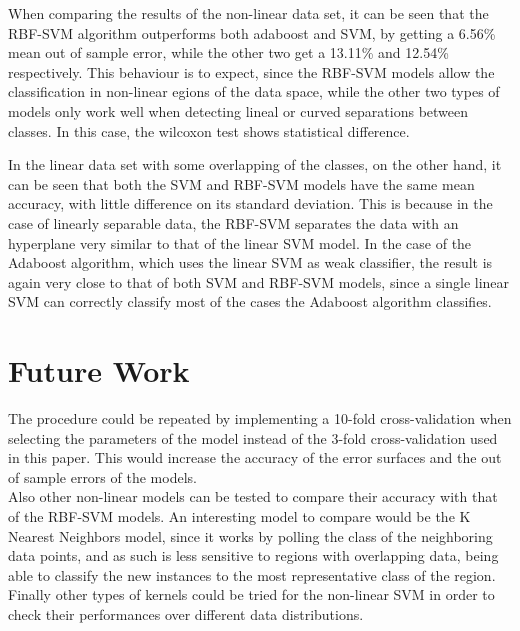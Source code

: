 \documentclass[10pt, journal]{IEEEtran}
\begin{document}
When comparing the results of the non-linear data set, it can be seen that the RBF-SVM algorithm outperforms both adaboost and SVM, by getting a 6.56\% mean out of sample error, while the other two get a 13.11\% and 12.54\% respectively. This behaviour is to expect, since the RBF-SVM models allow the classification in non-linear egions of the data space, while the other two types of models only work well when detecting lineal or curved separations between classes. In this case, the wilcoxon test shows statistical difference.

In the linear data set with some overlapping of the classes, on the other hand, it can be seen that both the SVM and RBF-SVM models have the same mean accuracy, with little difference on its standard deviation. This is because in the case of linearly separable data, the RBF-SVM separates the data with an hyperplane very similar to that of the linear SVM model. In the case of the Adaboost algorithm, which uses the linear SVM as weak classifier, the result is again very close to that of both SVM and RBF-SVM models, since a single linear SVM can correctly classify most of the cases the Adaboost algorithm classifies.\\



\section{Future Work} %
\label{sec:future_work}
The procedure could be repeated by implementing a 10-fold cross-validation when selecting the parameters of the model instead of the 3-fold cross-validation used in this paper. This would increase the accuracy of the error surfaces and the out of sample errors of the models.\\

Also other non-linear models can be tested to compare their accuracy with that of the RBF-SVM models. An interesting model to compare would be the K Nearest Neighbors model, since it works by polling the class of the neighboring data points, and as such is less sensitive to regions with overlapping data, being able to classify the new instances to the most representative class of the region.\\

Finally other types of kernels could be tried for the non-linear SVM in order to check their performances over different data distributions.\\



\end{document}
